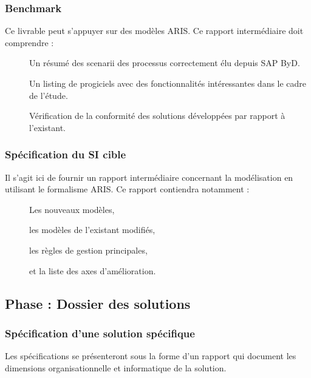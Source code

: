 \subsubsection{Benchmark}

Ce livrable peut s'appuyer sur des modèles ARIS. Ce rapport intermédiaire doit comprendre : \\

\begin{description}
    \item[\textbullet] Un résumé des scenarii des processus correctement élu depuis SAP ByD.
    \item[\textbullet] Un listing de progiciels avec des fonctionnalités intéressantes dans le cadre de l’étude.
    \item[\textbullet] Vérification de la conformité des solutions développées par rapport à l’existant.
\end{description}

\subsubsection{Spécification du SI cible}

Il s’agit ici de fournir un rapport intermédiaire concernant la modélisation en utilisant le formalisme ARIS. Ce rapport contiendra notamment : \\
\begin{description}
    \item[\textbullet] Les nouveaux modèles,
    \item[\textbullet] les modèles de l'existant modifiés,
    \item[\textbullet] les règles de gestion principales,
    \item[\textbullet] et la liste des axes d'amélioration.
\end{description}

\subsection{Phase : Dossier des solutions}

\subsubsection{Spécification d’une solution spécifique}

Les spécifications se présenteront sous la forme d’un rapport qui document les dimensions organisationnelle et informatique de la solution.

